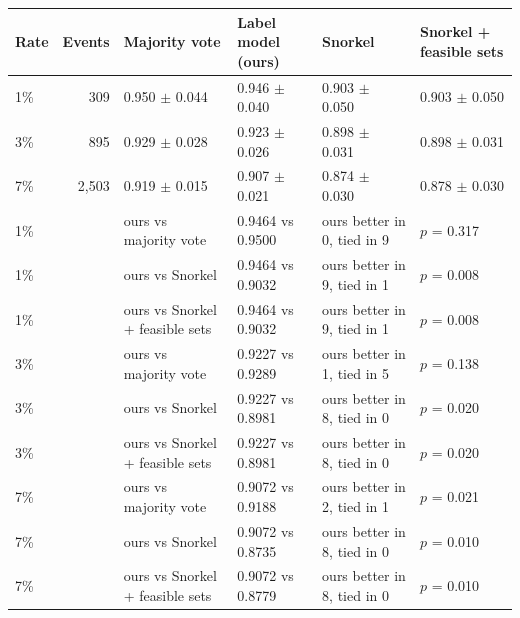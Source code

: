 \documentclass[11pt,a4paper]{article}
\makeatletter
\newenvironment{stable}{\par\addvspace{8pt}\noindent\begin{minipage}{\textwidth}\def\@captype{table}\centering}{\end{minipage}\par\addvspace{8pt}}
\makeatother
\begin{document}
\begin{stable}
\caption{Snorkel's label model on the same rule votes (injected data, the typed events matched by a rule item; macro-F1, mean $\pm$ s.d. over the 10 test seeds), and paired Wilcoxon tests of our label model against each labeller (lower block: mean macro-F1, seeds in which ours is better and tied). Feasible sets: Snorkel's probabilities restricted to the item's feasible classes.}\label{tab:s-snorkel}
\scriptsize\setlength{\tabcolsep}{4pt}
\begin{tabular}{@{}l r l l l l@{}}
\toprule
Rate & Events & Majority vote & Label model (ours) & Snorkel & Snorkel + feasible sets \\
\midrule
1\% & 309 & 0.950 $\pm$ 0.044 & 0.946 $\pm$ 0.040 & 0.903 $\pm$ 0.050 & 0.903 $\pm$ 0.050 \\
3\% & 895 & 0.929 $\pm$ 0.028 & 0.923 $\pm$ 0.026 & 0.898 $\pm$ 0.031 & 0.898 $\pm$ 0.031 \\
7\% & 2,503 & 0.919 $\pm$ 0.015 & 0.907 $\pm$ 0.021 & 0.874 $\pm$ 0.030 & 0.878 $\pm$ 0.030 \\
\midrule
1\% &  & ours vs majority vote & 0.9464 vs 0.9500 & ours better in 0, tied in 9 & $p$ = 0.317 \\
1\% &  & ours vs Snorkel & 0.9464 vs 0.9032 & ours better in 9, tied in 1 & $p$ = 0.008 \\
1\% &  & ours vs Snorkel + feasible sets & 0.9464 vs 0.9032 & ours better in 9, tied in 1 & $p$ = 0.008 \\
3\% &  & ours vs majority vote & 0.9227 vs 0.9289 & ours better in 1, tied in 5 & $p$ = 0.138 \\
3\% &  & ours vs Snorkel & 0.9227 vs 0.8981 & ours better in 8, tied in 0 & $p$ = 0.020 \\
3\% &  & ours vs Snorkel + feasible sets & 0.9227 vs 0.8981 & ours better in 8, tied in 0 & $p$ = 0.020 \\
7\% &  & ours vs majority vote & 0.9072 vs 0.9188 & ours better in 2, tied in 1 & $p$ = 0.021 \\
7\% &  & ours vs Snorkel & 0.9072 vs 0.8735 & ours better in 8, tied in 0 & $p$ = 0.010 \\
7\% &  & ours vs Snorkel + feasible sets & 0.9072 vs 0.8779 & ours better in 8, tied in 0 & $p$ = 0.010 \\
\bottomrule
\end{tabular}
\end{stable}
\end{document}
